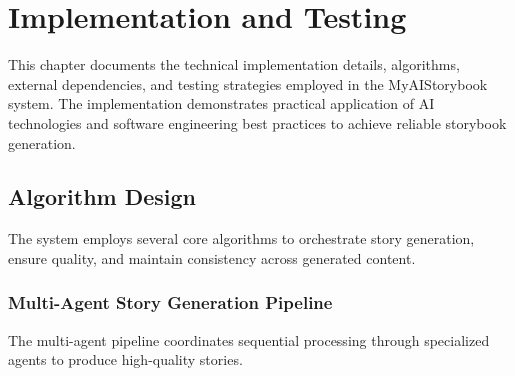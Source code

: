 \chapter{Implementation and Testing}

This chapter documents the technical implementation details, algorithms, external dependencies, and testing strategies employed in the MyAIStorybook system. The implementation demonstrates practical application of AI technologies and software engineering best practices to achieve reliable storybook generation.

\section{Algorithm Design}

The system employs several core algorithms to orchestrate story generation, ensure quality, and maintain consistency across generated content.

\subsection{Multi-Agent Story Generation Pipeline}

The multi-agent pipeline coordinates sequential processing through specialized agents to produce high-quality stories.

